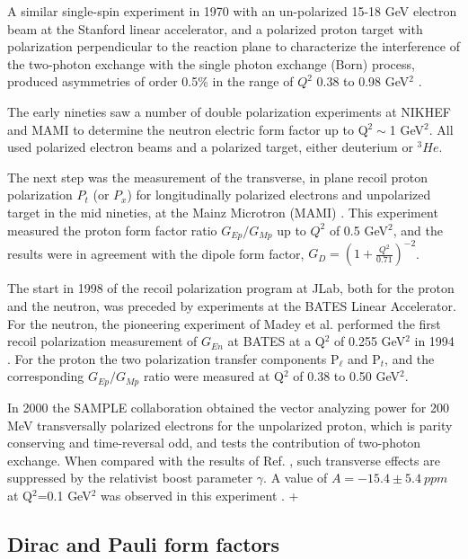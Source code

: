 A similar single-spin experiment in 1970 with an un-polarized 15-18 GeV electron beam at the Stanford linear accelerator,
 and a polarized proton target with polarization perpendicular to the reaction plane to characterize the interference of
 the two-photon exchange with the single photon exchange (Born) process, produced asymmetries of order 0.5\% in the
 range of $Q^2$ 0.38 to 0.98 GeV$^2$ \cite{Powell:1970}. 

The early nineties saw a number of double polarization experiments at NIKHEF \cite{passchier} and MAMI \cite{herberg,ostrick} to determine 
the neutron electric form factor up to 
Q$^2\sim $1 GeV$^2$. All used polarized electron beams and a polarized target, either deuterium or $^3He$.  

The next step was the measurement of the transverse, in plane recoil proton polarization $P_t$ (or $P_x$) for longitudinally 
polarized electrons and unpolarized target in the mid nineties, at the Mainz Microtron (MAMI) \cite{eyl:1995,pospischil}. 
This experiment measured the proton form factor ratio $G_{Ep}/G_{Mp}$ up to $Q^2$ of 0.5 GeV$^2$, and the results were in agreement 
with the dipole form factor, $G_D=(1+\frac{Q^2}{0.71})^{-2}$. 

The start in 1998 of the recoil polarization program at JLab, both for the proton and the neutron, was preceded by experiments at the BATES
 Linear Accelerator. For the neutron, the pioneering experiment of Madey et al. performed the first
 recoil polarization measurement of $G_{En}$ at BATES at a Q$^2$ of 0.255 GeV$^2$ in 1994 \cite{eden:1994}. 
 For the proton the two polarization transfer components P$_{\ell}$ and P$_t$, and the corresponding
 $G_{Ep}/G_{Mp}$ ratio were measured at Q$^2$ of 0.38 to 0.50 GeV$^2$\cite{barkhuff,milbrathA,milbrathB}. 

In 2000 the SAMPLE collaboration obtained the vector analyzing power for 200 MeV transversally polarized electrons for the unpolarized proton, 
which is parity conserving and 
time-reversal odd, and tests the contribution of two-photon exchange. When compared with the results of Ref. \cite{bizot}, such transverse effects 
are suppressed by the relativist boost parameter $\gamma$. A value of  $A=-15.4\pm 5.4 \ {ppm}$ at Q$^2$=0.1 GeV$^2$ was observed
in this experiment \cite{beise:2004}. 
+
\subsection{Dirac and Pauli form factors}

